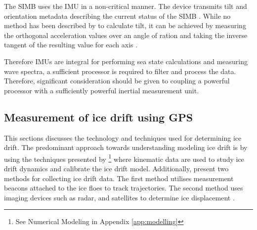 The SIMB uses the IMU in a non-critical manner. The device transmits tilt and orientation metadata  describing the current status of the SIMB \cite{planck2019evolution}. While no method has been described by \textcite{planck2019evolution} to calculate tilt, it can be achieved by measuring the orthogonal acceleration values over an angle of ration and taking the inverse tangent of the resulting value for each axis \cite{tuck2007tilt}.


Therefore IMUs are integral for performing sea state calculations and measuring wave spectra, a sufficient processor is required to filter and process the data. Therefore, significant consideration should be given to coupling a powerful processor with a sufficiently powerful inertial measurement unit.

\subsection{Measurement of ice drift using GPS}
\label{sec:ch2_drift}

This sections discusses the technology and techniques used for determining ice drift. The predominant approach towards understanding modeling ice drift is by using the techniques presented by \textcite{hibler1979dynamic}\footnote{See Numerical Modeling in Appendix \ref{app:modelling}} where kinematic data are used to study ice drift dynamics and calibrate the ice drift model. Additionally, \textcite{lepparanta2001sea} present two methods for collecting ice drift data. The first method utilises measurement beacons attached to the ice floes to track trajectories. The second method uses imaging devices such as radar, and satellites to determine ice displacement \cite{lepparanta2001sea}.\par

